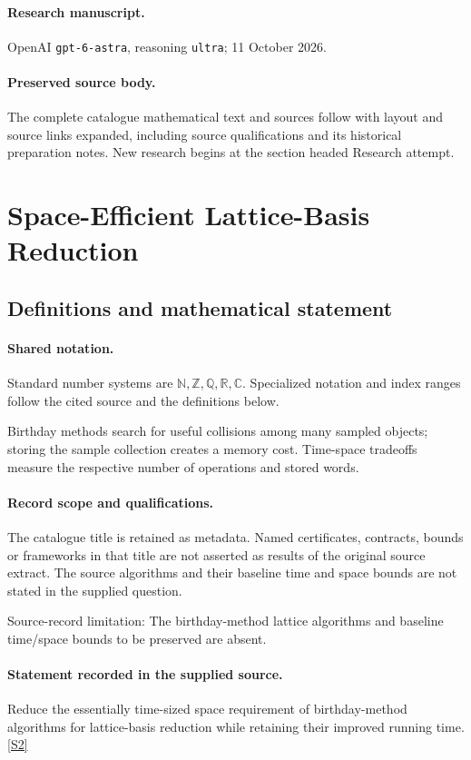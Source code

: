 \documentclass[11pt]{article}
\begin{document}
\paragraph{Research manuscript.} OpenAI \texttt{gpt-6-astra}, reasoning \texttt{ultra}; 11 October 2026.
\paragraph{Preserved source body.} The complete catalogue mathematical text and sources follow with layout and source links expanded, including source qualifications and its historical preparation notes. New research begins at the section headed Research attempt.

\section{Space-Efficient Lattice-Basis Reduction}\label{statement}

\subsection{Definitions and mathematical statement}

\paragraph{Shared notation.}Standard number systems are $\mathbb N,\mathbb Z,\mathbb Q,\mathbb R,\mathbb C$. Specialized notation and index ranges follow the cited source and the definitions below.


Birthday methods search for useful collisions among many sampled objects; storing the sample collection creates a memory cost. Time-space tradeoffs measure the respective number of operations and stored words.
\paragraph{Record scope and qualifications.}
The catalogue title is retained as metadata. Named certificates, contracts, bounds or frameworks in that title are not asserted as results of the original source extract.
The source algorithms and their baseline time and space bounds are not stated in the supplied question.

Source-record limitation: The birthday-method lattice algorithms and baseline time/space bounds to be preserved are absent.
\paragraph{Statement recorded in the supplied source.}
Reduce the essentially time-sized space requirement of birthday-method algorithms for lattice-basis reduction while retaining their improved running time. \href{https://doi.org/10.4171/owr/2005/26}{[S2]}
\end{document}

